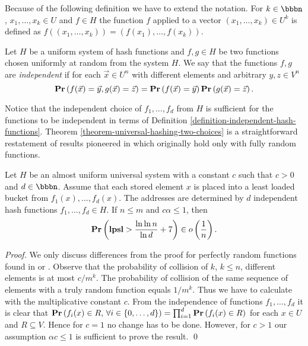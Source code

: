 Because of the following definition we have to extend the notation. For $k \in \bbbn$, $x_1, \dots, x_k \in U$ and $f \in H$ the function $f$ applied to a vector $(x_1, \dots, x_k) \in U^k$ is defined as $f((x_1, \dots, x_k)) = (f(x_1), \dots, f(x_k))$.
\begin{definition}
\label{definition-independent-hash-functions}
Let $H$ be a uniform system of hash functions and $f, g \in H$ be two functions chosen uniformly at random from the system $H$. We say that the functions $f, g$ are \emph{independent} if for each $\vec{x} \in U^n$ with different elements and arbitrary $y, z \in V^n$ $$\mathbf{Pr}\left(f(\vec{x}) = \vec{y}, g(\vec{x}) = \vec{z}\right) = \mathbf{Pr}\left(f(\vec{x}) = \vec{y}\right) \mathbf{Pr}\left(g(\vec{x}) = \vec{z}\right).$$
\end{definition}

Notice that the independent choice of $f_1, \dots, f_d$ from $H$ is sufficient for the functions to be independent in terms of Definition \ref{definition-independent-hash-functions}. Theorem \ref{theorem-universal-hashing-two-choices} is a straightforward restatement of results pioneered in \cite{DBLP:conf/stoc/AzarBKU94} which originally hold only with fully random functions.

\begin{theorem}
\label{theorem-universal-hashing-two-choices}
Let $H$ be an almost uniform universal system with a constant $c$ such that $c > 0$ and $d \in \bbbn$. Assume that each stored element $x$ is placed into a least loaded bucket from $f_1(x), \dots, f_d(x)$. The addresses are determined by $d$ independent hash functions $f_1, \dots, f_d \in H$. If $n \leq m$ and $c \alpha \leq 1$, then $$\mathbf{Pr}\left(\mathbf{lpsl} > \frac{\ln \ln n}{\ln d} + 7\right) \in o\left(\frac{1}{n}\right).$$
\end{theorem}
\begin{proof}
We only discuss differences from the proof for perfectly random functions found in \cite{Mitzenmacher:2005:PCR:1076315} or \cite{DBLP:conf/stoc/AzarBKU94}. Observe that the probability of collision of $k$, $k \leq n$, different elements is at most ${c}/{m^k}$. The probability of collision of the same sequence of elements with a truly random function equals ${1}/{m^k}$. Thus we have to calculate with the multiplicative constant $c$.
From the independence of functions $f_1, \dots, f_d$ it is clear that $\mathbf{Pr}\left(f_i(x) \in R,\, \forall i \in \{0, \dots, d\}\right) = \prod_{i = 1}^{d}\mathbf{Pr}\left(f_i(x) \in R\right)$ for each $x \in U$ and $R \subseteq V$. Hence for $c = 1$ no change has to be done. However, for $c > 1$ our assumption $\alpha c \leq 1$ is sufficient to prove the result.
\qed
\end{proof}

